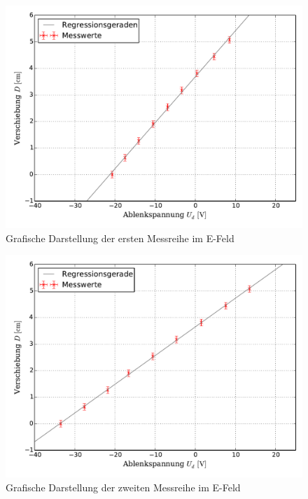 		
		\begin{figure}[!h]
				\includegraphics[scale=0.7]{Grafiken/EFeld_Messreihe_I.pdf}
				\caption{Grafische Darstellung der ersten Messreihe im E-Feld}\label{fig:Auswertung_Messdaten_I_I}
		\end{figure}
		
		\begin{figure}[!h]
		\centering
				\includegraphics[scale=0.7]{Grafiken/EFeld_Messreihe_II.pdf}
				\caption{Grafische Darstellung der zweiten Messreihe im E-Feld}\label{fig:Auswertung_Messdaten_I_II}
		\end{figure}
		
